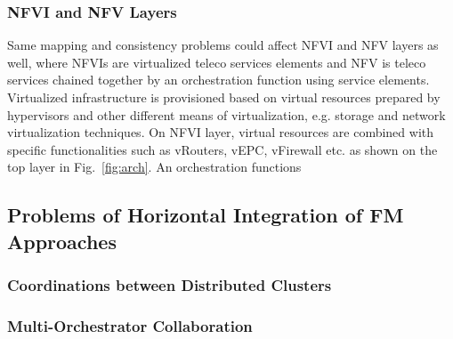 \subsubsection{NFVI and NFV Layers}

Same mapping and consistency problems could affect NFVI and NFV layers as well,
where NFVIs are virtualized teleco services elements and NFV is teleco services
chained together by an orchestration function using service elements. Virtualized
infrastructure is provisioned based on virtual resources prepared by hypervisors
and other different means of virtualization, e.g. storage and network
virtualization techniques. On NFVI layer, virtual resources are combined with
specific functionalities such as vRouters, vEPC, vFirewall etc. as shown on the
top layer in Fig.~\ref{fig:arch}. An orchestration functions   


\subsection{Problems of Horizontal Integration of FM Approaches}

\subsubsection{Coordinations between Distributed Clusters}

\subsubsection{Multi-Orchestrator Collaboration}
